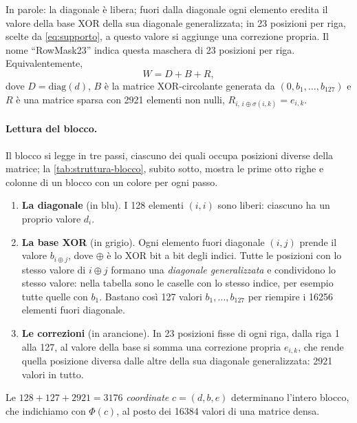 In parole: la diagonale è libera; fuori dalla diagonale ogni elemento eredita il valore della base XOR della sua diagonale generalizzata; in 23 posizioni per riga, scelte da \eqref{eq:supporto}, a questo valore si aggiunge una correzione propria. Il nome ``RowMask23'' indica questa maschera di 23 posizioni per riga. Equivalentemente,
\begin{equation}
W = D + B + R,
\label{eq:scomposizione}
\end{equation}
dove $D=\mathrm{diag}(d)$, $B$ è la matrice XOR-circolante generata da $(0,b_1,\dots,b_{127})$ e $R$ è una matrice sparsa con \num{2921} elementi non nulli, $R_{i,\,i\oplus\sigma(i,k)}=e_{i,k}$.

\paragraph{Lettura del blocco.} Il blocco si legge in tre passi, ciascuno dei quali occupa posizioni diverse della matrice; la \autoref{tab:struttura-blocco}, subito sotto, mostra le prime otto righe e colonne di un blocco con un colore per ogni passo.
\begin{enumerate}
\item \textbf{La diagonale} (in blu). I 128 elementi $(i,i)$ sono liberi: ciascuno ha un proprio valore $d_i$.
\item \textbf{La base XOR} (in grigio). Ogni elemento fuori diagonale $(i,j)$ prende il valore $b_{i\oplus j}$, dove $\oplus$ è lo XOR bit a bit degli indici. Tutte le posizioni con lo stesso valore di $i\oplus j$ formano una \emph{diagonale generalizzata} e condividono lo stesso valore: nella tabella sono le caselle con lo stesso indice, per esempio tutte quelle con $b_1$. Bastano così 127 valori $b_1,\dots,b_{127}$ per riempire i \num{16256} elementi fuori diagonale.
\item \textbf{Le correzioni} (in arancione). In 23 posizioni fisse di ogni riga, dalla riga 1 alla 127, al valore della base si somma una correzione propria $e_{i,k}$, che rende quella posizione diversa dalle altre della sua diagonale generalizzata: \num{2921} valori in tutto.
\end{enumerate}
Le $128+127+\num{2921}=\num{3176}$ \emph{coordinate} $c=(d,b,e)$ determinano l'intero blocco, che indichiamo con $\Phi(c)$, al posto dei \num{16384} valori di una matrice densa.


